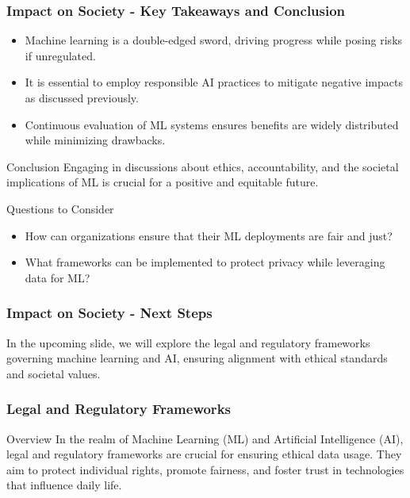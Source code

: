 \documentclass[aspectratio=169]{beamer}
\begin{document}
\begin{frame}[fragile]
    \frametitle{Impact on Society - Key Takeaways and Conclusion}
    \begin{itemize}
        \item Machine learning is a double-edged sword, driving progress while posing risks if unregulated.
        \item It is essential to employ responsible AI practices to mitigate negative impacts as discussed previously.
        \item Continuous evaluation of ML systems ensures benefits are widely distributed while minimizing drawbacks.
    \end{itemize}
    \begin{block}{Conclusion}
        Engaging in discussions about ethics, accountability, and the societal implications of ML is crucial for a positive and equitable future.
    \end{block}
    \begin{block}{Questions to Consider}
        \begin{itemize}
            \item How can organizations ensure that their ML deployments are fair and just?
            \item What frameworks can be implemented to protect privacy while leveraging data for ML?
        \end{itemize}
    \end{block}
\end{frame}

\begin{frame}[fragile]
    \frametitle{Impact on Society - Next Steps}
    In the upcoming slide, we will explore the legal and regulatory frameworks governing machine learning and AI, ensuring alignment with ethical standards and societal values.
\end{frame}

\begin{frame}[fragile]
    \frametitle{Legal and Regulatory Frameworks}
    \begin{block}{Overview}
        In the realm of Machine Learning (ML) and Artificial Intelligence (AI), legal and regulatory frameworks are crucial for ensuring ethical data usage. They aim to protect individual rights, promote fairness, and foster trust in technologies that influence daily life.
    \end{block}
\end{frame}
\end{document}
